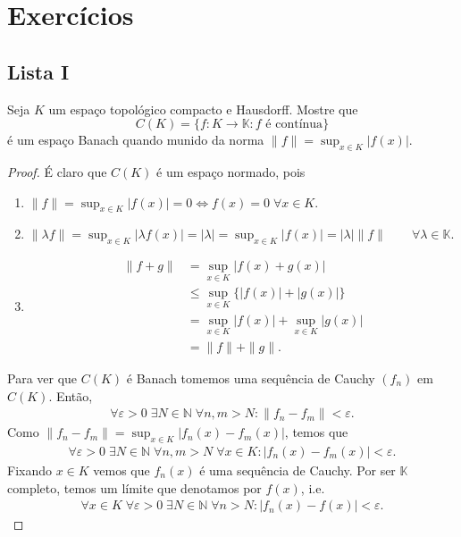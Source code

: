 \documentclass[portuguese]{article}
\theoremstyle{definition}
\newcommand{\N}{\mathbb{N}}
\begin{document}
	\section{Exercícios}
	\subsection{Lista I}
	\begin{exer*}[1]\label{exer:1}
		Seja $K$ um espaço topológico compacto e Hausdorff. Mostre que
		\[C(K)=\{f:K\to\mathbb{K}:f\text{ é contínua}\}\]
		é um espaço Banach quando munido da norma $\| f\|=\sup_{x\in K}|f(x)|$.
	\end{exer*}
	\begin{proof}
		É claro que $C(K)$ é um espaço normado, pois
		\begin{enumerate}
			\item $\| f\|=\sup_{x\in K}|f(x)|=0\iff f(x)=0\;\forall x\in K$.
			\item $\| \lambda f\| =\sup_{x\in K}|\lambda f(x)|=|\lambda|=\sup_{x\in K}|f(x)|=|\lambda|\| f\|\qquad\forall\lambda\in\mathbb{K}$.
			\item
			\begin{align*}
				\| f+g\|&=\sup_{x\in K}|f(x)+g(x)|\\
				&\leq\sup_{x\in K}\{|f(x)|+|g(x)|\}\\
				&=\sup_{x\in K}|f(x)|+\sup_{x\in K}|g(x)|\\
				&=\| f\|+\| g\|.
			\end{align*}
		\end{enumerate}
		Para ver que $C(K)$ é Banach tomemos uma sequência de Cauchy $(f_n)$ em $C(K)$. Então,
		\begin{gather*}
			\forall\varepsilon>0\;\exists N\in\N\;\forall n,m>N:\| f_n-f_m\|<\varepsilon.
		\end{gather*}
		Como $\| f_n-f_m\|=\sup_{x\in K}|f_n(x)-f_m(x)|$, temos que
		\begin{gather*}
			\forall\varepsilon>0\;\exists N\in\N\;
			\forall n,m>N\;\forall x\in K:
			|f_n(x)-f_m(x)|<\varepsilon.
		\end{gather*}
		Fixando $x\in K$ vemos que $f_n(x)$ é uma sequência de Cauchy. Por ser $\mathbb{K}$ completo, temos um límite que denotamos por $f(x)$, i.e.
		\begin{equation}\label{eq:ex1.1}
			\begin{gathered}
				\forall x\in K\;\forall\varepsilon>0\;\exists N\in\N\;\forall
				n>N:|f_n(x)-f(x)|<\varepsilon.
			\end{gathered}

\end{equation}
\end{proof}
\end{document}
